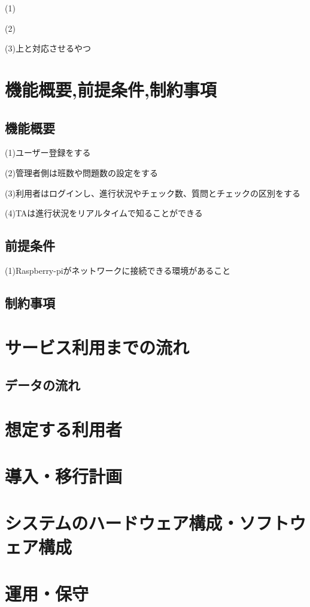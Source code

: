 \documentclass[a4j,titlepage]{ujarticle}
\begin{document}
(1)

(2)

(3)上と対応させるやつ

\section{機能概要,前提条件,制約事項}

\subsection{機能概要}

(1)ユーザー登録をする

(2)管理者側は班数や問題数の設定をする

(3)利用者はログインし、進行状況やチェック数、質問とチェックの区別をする

(4)TAは進行状況をリアルタイムで知ることができる
\subsection{前提条件}

(1)Raspberry-piがネットワークに接続できる環境があること


\subsection{制約事項}

\section{サービス利用までの流れ}
\subsection{データの流れ}


\section{想定する利用者}
\section{導入・移行計画}
\section{システムのハードウェア構成・ソフトウェア構成}
\section{運用・保守}
\end{document}
